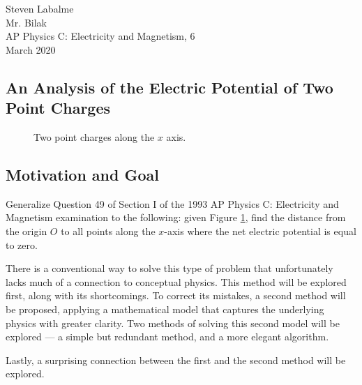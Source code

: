 \documentclass[titlepage]{article}
\begin{document}
\noindent Steven Labalme\\
\noindent Mr. Bilak\\
\noindent AP Physics C: Electricity and Magnetism, 6\\
 March 2020\\
\begin{center}
    \section*{An Analysis of the Electric Potential of Two Point Charges}
\end{center}

\begin{figure}[h!]
    \centering
    \caption{Two point charges along the $x$ axis.}
    \label{fig:2charges}
\end{figure}

\subsection*{Motivation and Goal}
Generalize Question 49 of Section I of the 1993 AP Physics C: Electricity and Magnetism examination to the following: given Figure \ref{fig:2charges}, find the distance from the origin $O$ to all points along the $x$-axis where the net electric potential is equal to zero.\par
There is a conventional way to solve this type of problem that unfortunately lacks much of a connection to conceptual physics. This method will be explored first, along with its shortcomings. To correct its mistakes, a second method will be proposed, applying a mathematical model that captures the underlying physics with greater clarity. Two methods of solving this second model will be explored --- a simple but redundant method, and a more elegant algorithm.\par
Lastly, a surprising connection between the first and the second method will be explored.
\end{document}
